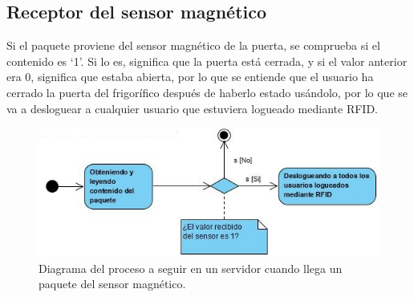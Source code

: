 \subsection{Receptor del sensor magnético}

Si el paquete proviene del sensor magnético de la puerta, se comprueba si el contenido es ‘1’. Si lo es, significa que la puerta está cerrada, y si el valor anterior era 0, significa que estaba abierta, por lo que se entiende que el usuario ha cerrado la puerta del frigorífico después de haberlo estado usándolo, por lo que se va a desloguear a cualquier usuario que estuviera logueado mediante RFID.

\begin{figure}[h]
    \centering
    \includegraphics[width=.60\textwidth]{capitulos/capitulo7/diagramaMagneticoServer.jpg}
    \caption{Diagrama del proceso a seguir en un servidor cuando llega un paquete del sensor magnético.}
    \label{fig:diagramamagneticoserver}
\end{figure}

